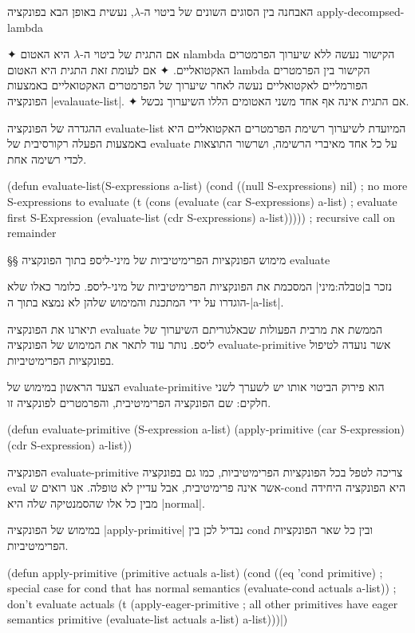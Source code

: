 האבחנה בין הסוגים השונים של ביטוי ה-$λ$, נעשית באופן הבא בפונקציה
apply-decompsed-lambda
\begin{itemize}
  ✦
  אם התגית של ביטוי ה-$λ$ היא האטום nlambda הקישור נעשה
  ללא שיערוך הפרמטרים
  האקטואליים.
  ✦ אם לעומת זאת התגית היא האטום lambda הקישור בין הפרמטרים הפורמליים
  לאקטואליים נעשה לאחר שיערוך של הפרמטרים האקטואליים באמצעות הפונקציה
  \E|evalauate-list|. ✦
  אם התגית אינה אף אחד משני האטומים הללו השיערוך נכשל.
\end{itemize}

ההגדרה של הפונקציה evaluate-list המיועדת לשיערוך רשימת הפרמטרים האקטואליים היא
באמצעות הפעלה רקורסיבית של evaluate על כל אחד מאיברי הרשימה, ושרשור התוצאות
לכדי רשימה אחת.
\begin{KERNEL}
(defun evaluate-list(S-expressions a-list)
  (cond ((null S-expressions) nil) ; no more S-expressions to evaluate
    (t (cons
          (evaluate (car S-expressions) a-list) ; evaluate first S-Expression
          (evaluate-list (cdr S-expressions) a-list))))) ; recursive call on remainder
\end{KERNEL}

§§ מימוש הפונקציות הפרימיטיביות של מיני-ליספ בתוך הפונקציה evaluate

נזכר ב|טבלה:מיני| המסכמת את הפונקציות הפרימיטיביות של מיני-ליספ. כלומר כאלו
שלא הוגדרו על ידי המתכנת והמימוש שלהן לא נמצא בתוך ה-\E|a-list|.

תיארנו את הפונקציה evaluate הממשת את מרבית הפעולות שבאלגוריתם השיערוך של ליספ.
נותר עוד לתאר את המימוש של הפונקציה evaluate-primitive אשר נועדה לטיפול
בפונקציות הפרימיטיביות.

הצעד הראשון במימוש של evaluate-primitive הוא פירוק הביטוי אותו יש לשערך לשני
חלקים: שם הפונקציה הפרימיטיבית, והפרמטרים לפונקציה זו.
\begin{KERNEL}
(defun evaluate-primitive (S-expression a-list)
  (apply-primitive (car S-expression) (cdr S-expression) a-list))
\end{KERNEL}

הפונקציה
evaluate-primitive צריכה לטפל בכל הפונקציות הפרימיטיביות, כמו גם בפונקציה eval
אשר אינה פרימיטיבית, אבל עדיין לא טופלה. אנו רואים ש-cond היא הפונקציה היחידה
מבין כל אלו שהסמנטיקה
שלה היא \E|normal|.

\minipage\textwidth
במימוש של הפונקציה \E|apply-primitive| נבדיל לכן בין cond ובין כל שאר הפונקציות
הפרימיטיביות.
\begin{KERNEL}
(defun apply-primitive (primitive actuals a-list)
  (cond ((eq 'cond primitive) ; special case for cond that has normal semantics
            (evaluate-cond actuals a-list)) ; don't evaluate actuals
        (t (apply-eager-primitive ; all other primitives have eager semantics
              primitive
              (evaluate-list actuals a-list)
              a-list)))|)
\end{KERNEL}
\endminipage

